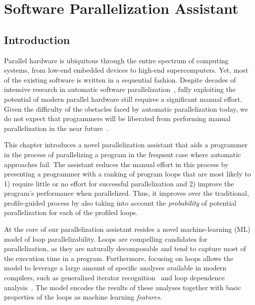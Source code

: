 \chapter{Software Parallelization Assistant}
\label{assistant}
\section{Introduction}


\quad Parallel hardware is ubiquitous through the entire spectrum of computing systems, from low-end embedded devices to high-end supercomputers.
%
Yet, most of the existing software is written in a sequential fashion.
%
Despite decades of intensive research in automatic software
parallelization~\cite{6813266}, fully exploiting the potential of modern parallel hardware still requires a significant manual effort.
%
Given the difficulty of the obstacles faced by automatic parallelization today, we do not expect that programmers will be liberated from performing manual parallelization in the near future~\cite{Larsen:2012:PML:2410141.2410600}.


This chapter introduces a novel parallelization assistant that aids a programmer in the process of parallelizing a program in the frequent case where automatic approaches fail.
%
The assistant reduces the manual effort in this process by presenting a programmer with a ranking of program loops that are most likely to 1) require little or no effort for successful parallelization and 2) improve the program's performance when parallelized.
%
Thus, it improves over the traditional, profile-guided process by also taking into account the \emph{probability} of potential parallelization for each of the profiled loops.


At the core of our parallelization assistant resides a novel machine-learning (ML) model of loop parallelizability.
%
Loops are compelling candidates for parallelization, as they are naturally decomposable and tend to capture most of the execution time in a program.
%
Furthermore, focusing on loops allows the model to leverage a large amount of specific analyses available in modern compilers, such as generalized iterator recognition~\cite{Manilov:2018:GPI:3178372.3179511} and loop dependence analysis~\cite{Jensen:2017:ILD:3132652.3095754}.
%
The model encodes the results of these analyses together with basic properties of the loops as machine learning \textit{features}.


